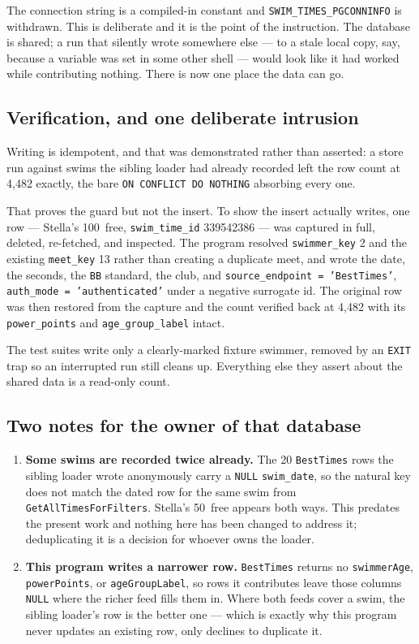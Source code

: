 \documentclass[11pt]{article}
\newcommand{\code}[1]{\texttt{#1}}
\begin{document}
The connection string is a compiled-in constant and
\code{SWIM\_TIMES\_PGCONNINFO} is withdrawn.  This is deliberate and it
is the point of the instruction.  The database is shared; a run that
silently wrote somewhere else --- to a stale local copy, say, because a
variable was set in some other shell --- would look like it had worked
while contributing nothing.  There is now one place the data can go.

\subsection{Verification, and one deliberate intrusion}

Writing is idempotent, and that was demonstrated rather than asserted:
a store run against swims the sibling loader had already recorded left
the row count at 4{,}482 exactly, the bare \code{ON CONFLICT DO
NOTHING} absorbing every one.

That proves the guard but not the insert.  To show the insert actually
writes, one row --- Stella's 100~free, \code{swim\_time\_id}
339542386 --- was captured in full, deleted, re-fetched, and inspected.
The program resolved \code{swimmer\_key} 2 and the existing
\code{meet\_key} 13 rather than creating a duplicate meet, and wrote
the date, the seconds, the \code{BB} standard, the club, and
\code{source\_endpoint = 'BestTimes'}, \code{auth\_mode =
'authenticated'} under a negative surrogate id.  The original row was
then restored from the capture and the count verified back at 4{,}482
with its \code{power\_points} and \code{age\_group\_label} intact.

The test suites write only a clearly-marked fixture swimmer, removed by
an \code{EXIT} trap so an interrupted run still cleans up.  Everything
else they assert about the shared data is a read-only count.

\subsection{Two notes for the owner of that database}

\begin{enumerate}[leftmargin=*]
\item \textbf{Some swims are recorded twice already.}  The 20
      \code{BestTimes} rows the sibling loader wrote anonymously carry
      a \code{NULL} \code{swim\_date}, so the natural key does not match
      the dated row for the same swim from
      \code{GetAllTimesForFilters}.  Stella's 50~free appears both
      ways.  This predates the present work and nothing here has been
      changed to address it; deduplicating it is a decision for
      whoever owns the loader.
\item \textbf{This program writes a narrower row.}  \code{BestTimes}
      returns no \code{swimmerAge}, \code{powerPoints}, or
      \code{ageGroupLabel}, so rows it contributes leave those columns
      \code{NULL} where the richer feed fills them in.  Where both
      feeds cover a swim, the sibling loader's row is the better one ---
      which is exactly why this program never updates an existing row,
      only declines to duplicate it.
\end{enumerate}
\end{document}

